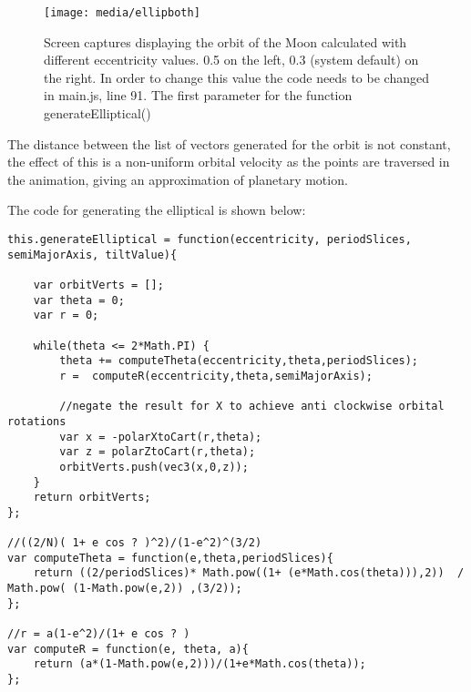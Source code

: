 \documentclass[titlepage]{article}
\begin{document}
\begin{figure}[h!]
                \centering
                \texttt{[image: media/ellipboth]}
                \caption{Screen captures displaying the orbit of the Moon calculated with different eccentricity values. 0.5 on the left, 0.3 (system default) on the right. In order to change this value the code needs to be changed in main.js, line 91. The first parameter for the function generateElliptical()}
            \end{figure}
\FloatBarrier
The distance between the list of vectors generated for the orbit is not constant, the effect of this is a non-uniform orbital velocity as the points are traversed in the animation, giving an approximation of planetary motion.

The code for generating the elliptical is shown below:

\begin{lstlisting}[caption=Above code can be found in OrbitUtils.js and is adapted from the formulas given in the assignment brief.]
this.generateElliptical = function(eccentricity, periodSlices, semiMajorAxis, tiltValue){

    var orbitVerts = [];
    var theta = 0;
    var r = 0;

    while(theta <= 2*Math.PI) {
        theta += computeTheta(eccentricity,theta,periodSlices);
        r =  computeR(eccentricity,theta,semiMajorAxis);

        //negate the result for X to achieve anti clockwise orbital rotations
        var x = -polarXtoCart(r,theta);
        var z = polarZtoCart(r,theta);
        orbitVerts.push(vec3(x,0,z));
    }
    return orbitVerts;
};

//((2/N)( 1+ e cos ? )^2)/(1-e^2)^(3/2)
var computeTheta = function(e,theta,periodSlices){
    return ((2/periodSlices)* Math.pow((1+ (e*Math.cos(theta))),2))  / Math.pow( (1-Math.pow(e,2)) ,(3/2));
};

//r = a(1-e^2)/(1+ e cos ? )
var computeR = function(e, theta, a){
    return (a*(1-Math.pow(e,2)))/(1+e*Math.cos(theta));
};
\end{lstlisting}
\end{document}

